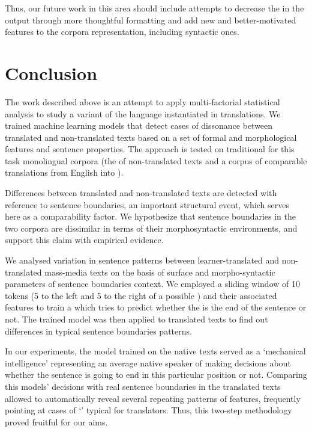 \documentclass[output=paper]{langsci/langscibook.cls}
\begin{document}
Thus, our future work in this area should include attempts to decrease the  in the output through more thoughtful formatting and add new and better-motivated features to the corpora representation, including syntactic ones.  

\section{Conclusion}\label{sec:andrey:concl}

The work described above is an attempt to apply multi-factorial statistical analysis to study a variant of the  language instantiated in  translations. We trained machine learning models that detect cases of dissonance between translated and non-translated texts based on a set of formal and morphological features and sentence properties. The approach is tested on traditional for this task monolingual corpora (the  of non-translated  texts and a corpus of comparable  translations from English into ). 

Differences between translated and non-translated texts are detected with reference to sentence boundaries, an important structural event, which serves here as a comparability factor. We hypothesize that sentence boundaries in the two corpora are dissimilar in terms of their morphosyntactic environments, and support this claim with empirical evidence. 

We analysed variation in sentence patterns between learner-translated and non-translated  mass-media texts on the basis of surface and morpho-syntactic parameters of sentence boundaries context. We employed a sliding window of 10 tokens (5 to the left and 5 to the right of a possible ) and their associated features to train a  which tries to predict whether the  is the end of the sentence or not. The trained model was then applied to translated texts to find out differences in typical sentence boundaries patterns. 

In our experiments, the model trained on the native texts served as a `mechanical intelligence' representing an average native speaker of  making decisions about whether the sentence is going to end in this particular position or not. Comparing this models' decisions with real sentence boundaries in the translated texts allowed to automatically reveal several repeating patterns of features, frequently pointing at cases of `' typical for  translators. Thus, this two-step methodology proved fruitful for our aims.
\end{document}

